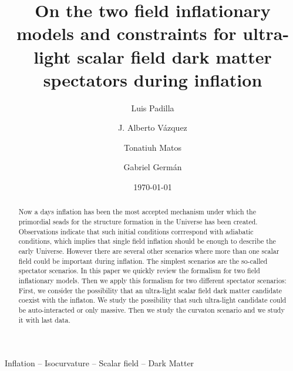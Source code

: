 \documentclass[amssymb,twocolumn,prd,nofootinbib,showpacs]{revtex4-1}
\begin{document}
\title{On the two field inflationary models and constraints for ultra-light scalar field dark matter spectators during inflation}
\author{Luis Padilla}  
   \author{J. Alberto V\'azquez}  
\author{Tonatiuh Matos}  
   \author{Gabriel Germ\'an}  

\date{\today}

\begin{abstract}
Now a days inflation has been the most accepted mechanism under which the primordial seads for the structure formation in the Universe has been created. Observations indicate that such initial conditions corrrespond with adiabatic conditions, which implies that single field inflation should be enough to describe the early Universe. However there are several other scenarios where more than one scalar field could be important during inflation. The simplest scenarios are the so-called spectator scenarios. In this paper we quickly review the formalism for two field inflationary models. Then we apply this formalism for two different spectator scenarios: First, we consider the possibility that an ultra-light scalar field dark matter candidate coexist with the inflaton. We study the possibility that such ultra-light candidate could be auto-interacted or only massive. Then we study the curvaton scenario and we study it with last data.    

\end{abstract}
\begin{keywords}
Inflation  --  Isocurvature  --  Scalar field -- Dark Matter
\end{keywords}

\maketitle
\end{document}

